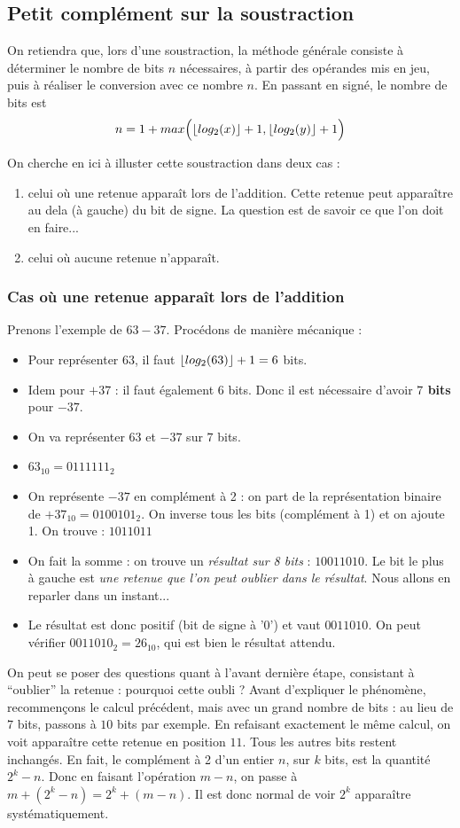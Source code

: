 \subsection{Petit complément sur la soustraction }
On retiendra que, lors d'une soustraction, la méthode générale consiste à déterminer le nombre de bits $n$ nécessaires, à partir
des opérandes mis en jeu, puis à réaliser le conversion avec ce nombre $n$. En passant en signé, le nombre de bits est
$$ n = 1 + max \Big( \floor*{log_2(x)}+1,\floor*{log_2 (y)}+1 \Big)$$

On cherche en ici à illuster cette soustraction dans deux cas :
\begin{enumerate}
\item celui où une retenue apparaît lors de l'addition. Cette retenue peut apparaître au dela (à gauche) du bit de signe. La question est de savoir ce que l'on doit en faire...
\item celui où aucune retenue n'apparaît.
\end{enumerate}

\subsubsection{Cas où une retenue apparaît lors de l'addition}
Prenons l'exemple de $63-37$. Procédons de manière mécanique :

\begin{itemize}
\item Pour représenter $63$, il faut $\floor*{log_2(63)}+1 =6$ bits.
\item Idem pour $+37$ : il faut également $6$ bits. Donc il est nécessaire d'avoir { \bf $7$ bits} pour $-37$.
\item On va représenter $63$ et $-37$ sur $7$ bits.
\item $63_{10}=0111111_2$
\item On représente $-37$ en complément à 2 : on part de la représentation binaire de $+37_{10}=0100101_2$. On inverse tous les bits (complément à 1) et on ajoute 1. On trouve : $1011011$
\item On fait la somme : on trouve un {\it résultat sur 8 bits} : $10011010$. Le bit le plus à gauche est {\it une retenue que l'on peut oublier dans le résultat}. Nous allons en reparler dans un instant...
\item Le résultat est donc positif (bit de signe à '0') et vaut $0011010$. On peut vérifier $0011010_2=26_{10}$, qui est bien le résultat attendu.
\end{itemize}
\bigskip
On peut se poser des questions quant à l'avant dernière étape, consistant à ``oublier'' la retenue : pourquoi cette oubli ? Avant d'expliquer le phénomène, recommençons le calcul précédent, mais avec un grand nombre de bits : au lieu de $7$ bits, passons à $10$ bits par exemple. En refaisant exactement le même calcul, on voit apparaître cette retenue en position $11$. Tous les autres bits restent inchangés.
En fait, le complément à 2 d'un entier $n$, sur $k$ bits, est la quantité $2^k-n$. Donc en faisant l'opération $m-n$, on passe à $m+(2^k-n)=2^k+(m-n)$. Il est donc normal de voir $2^k$ apparaître systématiquement.

